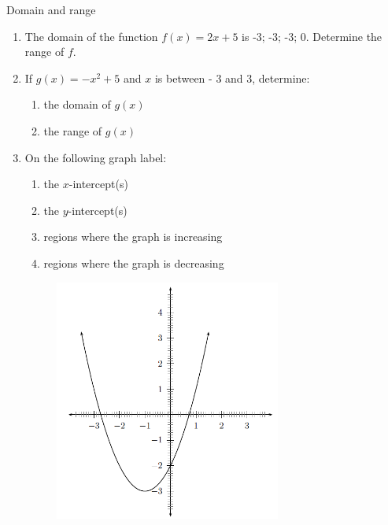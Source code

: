 \begin{exercises}{Domain and range }
 {\nopagebreak
\label{m39337*id237058}\begin{enumerate}[noitemsep, label=\textbf{\arabic*}. ] 
\label{m39337*uid54}\item The domain of the function $f\left(x\right)=2x+5$ is -3; -3; -3; 0. Determine the range of $f$.
\label{m39337*uid55}\item If $g\left(x\right)=-{x}^{2}+5$ and $x$ is between - 3 and 3, determine:
\label{m39337*id237164}\begin{enumerate}[noitemsep, label=\textbf{\alph*}. ] 
\label{m39337*uid56}\item the domain of $g\left(x\right)$\label{m39337*uid57}\item the range of $g\left(x\right)$\end{enumerate}
  \label{m39337*uid58}\item On the following graph label:
\label{m39337*id237234}\begin{enumerate}[noitemsep, label=\textbf{\alph*}. ] 
\label{m39337*uid59}\item the $x$-intercept(s)
\label{m39337*uid60}\item the $y$-intercept(s)
\label{m39337*uid61}\item regions where the graph is increasing
\label{m39337*uid62}\item regions where the graph is decreasing
\end{enumerate}
\setcounter{subfigure}{0}
\begin{figure}[H] %
\begin{center}
\label{m39337*id237308!!!underscore!!!media}\label{m39337*id237308!!!underscore!!!printimage}\includegraphics[height=300px]{col11306.imgs/m39337_MG10C11_003.png} %

\end{center}
\end{figure}
\end{enumerate}}
\end{exercises}
